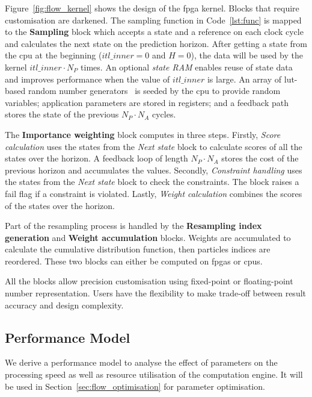 Figure~\ref{fig:flow_kernel} shows the design of the \gls{fpga} kernel. Blocks that require customisation are darkened.
The sampling function in Code~\ref{lst:func} is mapped to the \textbf{Sampling} block which accepts a state and a reference on each clock cycle and calculates the next state on the prediction horizon.
After getting a state from the \gls{cpu} at the beginning ($itl\_inner=0$ and $H=0$), the data will be used by the kernel $itl\_inner \cdot N_P$ times.
An optional \textit{state RAM} enables reuse of state data and improves performance when the value of $itl\_inner$ is large.
An array of \gls{lut}-based random number generators~\cite{thomas07,thomas10} is seeded by the \gls{cpu} to provide random variables; application parameters are stored in registers; and
a feedback path stores the state of the previous $N_P \cdot N_A$ cycles.

The \textbf{Importance weighting} block computes in three steps.
Firstly, \textit{Score calculation} uses the states from the \emph{Next state} block to calculate scores of all the states over the horizon.
A feedback loop of length $N_P \cdot N_A$ stores the cost of the previous horizon and accumulates the values.
Secondly, \textit{Constraint handling} uses the states from the \emph{Next state} block to check the constraints.
The block raises a fail flag if a constraint is violated.
Lastly, \textit{Weight calculation} combines the scores of the states over the horizon.

Part of the resampling process is handled by the \textbf{Resampling index generation} and \textbf{Weight accumulation} blocks.
Weights are accumulated to calculate the cumulative distribution function, then particles indices are reordered.
These two blocks can either be computed on \glspl{fpga} or \glspl{cpu}.

All the blocks allow precision customisation using fixed-point or floating-point number representation.
Users have the flexibility to make trade-off between result accuracy and design complexity.


\subsection{Performance Model}
\label{sec:flow_model}

We derive a performance model to analyse the effect of parameters on the processing speed as well as resource utilisation of the computation engine.
It will be used in Section~\ref{sec:flow_optimisation} for parameter optimisation.

